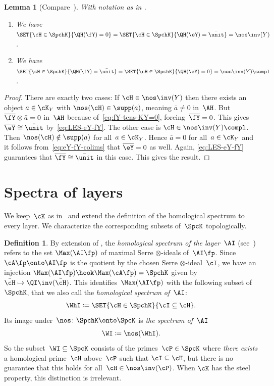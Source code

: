 \documentclass[11pt]{amsart}
\numberwithin{equation}{section} %
\theoremstyle{plain}
\newtheorem{lem}[equation]{Lemma}
\theoremstyle{definition}
\newtheorem{dfn}[equation]{Definition}
\theoremstyle{remark}
\begin{document}
%
\begin{lem}[{Compare~\cite[Lemma 3.8]{BarthelHeardSanders23a}}]
\label{lem:eY-fY-H}%
With notation as in .
\begin{enumerate}[\rm(a)]
\item
\label{it:eY-fY-H-in}%
 We have $\SET{\cH\in\SpchK}{\QH(\fY)=0}=\SET{\cH\in\SpchK}{\QH(\eY)=\bar\unit}=\nos\inv(Y)$.
%
\smallbreak
\item 
\label{it:eY-fY-H-out}%
We have $\SET{\cH\in\SpchK}{\QH(\fY)=\bar\unit}=\SET{\cH\in\SpchK}{\QH(\eY)=0}=\nos\inv(Y)\compl$.
\end{enumerate}
\end{lem}
%
\begin{proof}
There are exactly two cases: If $\cH\in\nos \inv(Y)$ then there exists an object $a \in \cK_Y$ with $\nos(\cH) \in \supp(a)$, meaning $\bar{a} \neq 0$ in~$\AH$. But $\overline{\fY}\otimes\bar{a}=0$ in~$\AH$ because of~\eqref{eq:fY-tens-KY=0}, forcing~$\overline{\fY}=0$. This gives~$\overline{\eY}\cong\bar\unit$ by~\eqref{eq:LES-eY-fY}. The other case is $\cH\in\nos\inv(Y)\compl$. Then $\nos(\cH)\notin\supp(a)$ for all~$a\in\cK_Y$. Hence $\bar{a}=0$ for all~$a\in \cK_Y$ and it follows from~\eqref{eq:eY-fY-colims} that $\overline{\eY}=0$ as well. Again, \eqref{eq:LES-eY-fY} guarantees that $\overline{\fY}\cong\bar\unit$ in this case. This gives the result.
\end{proof}

\section{Spectra of layers}
\label{sec:procon}%

We keep~$\cK$ as in~ and extend the definition of the homological spectrum to every layer. We characterize the corresponding subsets of~$\SpcK$ topologically.

%
\begin{dfn}
\label{dfn:spec-layer}%
By extension of , the \emph{homological spectrum of the layer~$\AI$} (see~) refers to the set $\Max(\AI\fp)$ of maximal Serre $\otimes$-ideals of~$\AI\fp$. Since $\cA\fp\onto\AI\fp$ is the quotient by the chosen Serre $\otimes$-ideal~$\cI$, we have an injection $\Max(\AI\fp)\hook\Max(\cA\fp)=\SpchK$ given by~$\bar\cH\mapsto \QI\inv(\bar\cH)$. This identifies~$\Max(\AI\fp)$ with the following subset of~$\SpchK$, that we also call the \emph{homological spectrum of~$\AI$}:
%
\[
\WhI\coloneq\SET{\cH\in\SpchK}{\cI\subseteq\cH}.
\]
%
Its image under~$\nos\colon \SpchK\onto \SpcK$ is \emph{the spectrum of~$\AI$}
%
\[
\WI\coloneq\nos(\WhI).
\]
%
So the subset~$\WI\subseteq\SpcK$ consists of the primes~$\cP\in\SpcK$ where \emph{there exists} a homological prime~$\cH$ above~$\cP$ such that $\cI\subseteq\cH$, but there is no guarantee that this holds for all~$\cH\in\nos\inv(\cP)$.
When $\cK$ has the steel property, this distinction is irrelevant.
\end{dfn}
\end{document}
